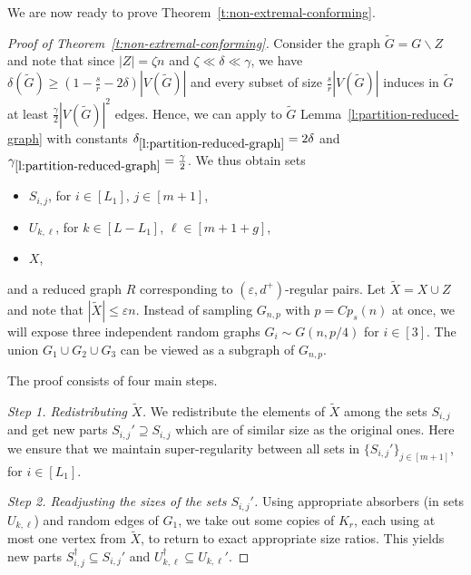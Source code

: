 \documentclass[reqno, 12pt]{amsart}
\numberwithin{equation}{section}
\numberwithin{figure}{section}
\theoremstyle{plain}
\theoremstyle{definition}
\let\eps=\varepsilon
\def \Gnp{G_{n,p}}
\let\setminus=\smallsetminus
\begin{document}
    We are now ready to prove Theorem~\ref{t:non-extremal-conforming}.

   
    
    \begin{proof}[Proof of Theorem~\ref{t:non-extremal-conforming}]
    Consider the graph $\tilde G = G\setminus Z$ and note that since $|Z|=\zeta n$ and $\zeta \ll \delta \ll \gamma$, we have $\delta(\tilde G)\geq\left(1-\frac{s}{r} - 2\delta\right)|V(\tilde G)|$ and every subset of size $\frac{s}{r}|V(\tilde G)|$ induces in $\tilde G$ at least $\frac{\gamma}2 |V(\tilde G)|^2$ edges.
    Hence, we can apply to $\tilde G$ Lemma~\ref{l:partition-reduced-graph} with constants $\delta_{\ref{l:partition-reduced-graph}}=2\delta$ and $\gamma_{\ref{l:partition-reduced-graph}}=\frac{\gamma}2$. We thus obtain sets
    \begin{itemize}
        \item $S_{i,j}$, for $i\in[L_1]$, $j\in[m+1]$,
        \item $U_{k,\ell}$, for $k\in[L-L_1]$, $\ell\in[m+1+g]$,
        \item $X$,
    \end{itemize} 
    and a reduced graph $R$ corresponding to $(\eps,d^+)$-regular pairs. Let $\tilde X = X \cup Z$ and note that $|\tilde X|\leq \eps n$. Instead of sampling $\Gnp$ with $p = Cp_s(n)$ at once, we will expose three independent random graphs $G_i \sim G(n, p/4)$ for $i \in [3]$. The union $G_1 \cup G_2 \cup G_3$ can be viewed as a subgraph of $\Gnp$.
    
    The proof consists of four main steps.
        
    \smallskip
 
    \textit{Step 1. Redistributing $\tilde X$.} We redistribute the elements of $\tilde X$ among the sets $S_{i,j}$ and get new parts $S_{i,j}'\supseteq S_{i,j}$ which are of similar size as the original ones. Here we ensure that we maintain super-regularity between all sets in $\{S_{i,j}'\}_{j\in[m+1]}$, for $i\in[L_1]$.

    \smallskip

    \textit{Step 2. Readjusting the sizes of the sets $S_{i,j}'$.} Using appropriate absorbers (in sets $U_{k,\ell}$) and random edges of $G_1$, we take out some copies of $K_r$, each using at most one vertex from $\tilde X$, to return to exact appropriate size ratios. This yields new parts $S_{i,j}^\dagger \subseteq S_{i,j}'$ and $U_{k,\ell}^\dagger \subseteq U_{k,\ell}'$.

    \smallskip


\end{proof}
\end{document}
